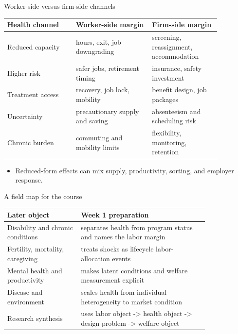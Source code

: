 \documentclass[aspectratio=169,11pt]{beamer}
\begin{document}
\begin{frame}{Worker-side versus firm-side channels}
\small
\begin{tabular}{p{0.28\linewidth} p{0.31\linewidth} p{0.28\linewidth}}
\toprule
Health channel & Worker-side margin & Firm-side margin \\
\midrule
Reduced capacity & hours, exit, job downgrading & screening, reassignment, accommodation \\
Higher risk & safer jobs, retirement timing & insurance, safety investment \\
Treatment access & recovery, job lock, mobility & benefit design, job packages \\
Uncertainty & precautionary supply and saving & absenteeism and scheduling risk \\
Chronic burden & commuting and mobility limits & flexibility, monitoring, retention \\
\bottomrule
\end{tabular}
\vspace{0.25cm}
\begin{itemize}
    \item Reduced-form effects can mix supply, productivity, sorting, and employer response.
\end{itemize}
\end{frame}

\begin{frame}{A field map for the course}
\small
\begin{tabular}{p{0.30\linewidth} p{0.52\linewidth}}
\toprule
Later object & Week 1 preparation \\
\midrule
Disability and chronic conditions & separates health from program status and names the labor margin \\
Fertility, mortality, caregiving & treats shocks as lifecycle labor-allocation events \\
Mental health and productivity & makes latent conditions and welfare measurement explicit \\
Disease and environment & scales health from individual heterogeneity to market condition \\
Research synthesis & uses labor object -> health object -> design problem -> welfare object \\
\bottomrule
\end{tabular}
\end{frame}
\end{document}
